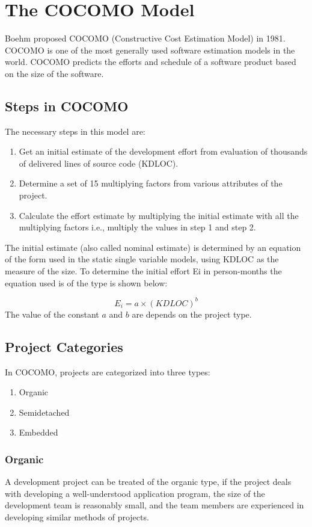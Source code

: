 \chapter{The COCOMO Model}
Boehm proposed COCOMO (Constructive Cost Estimation Model) in 1981. COCOMO is one of the most generally used software estimation models in the world. COCOMO predicts the efforts and schedule of a software product based on the size of the software.

\section{Steps in COCOMO}
The necessary steps in this model are:

\begin{enumerate}
 \item Get an initial estimate of the development effort from evaluation of thousands of delivered lines of source code (KDLOC).
 \item Determine a set of 15 multiplying factors from various attributes of the project.
 \item Calculate the effort estimate by multiplying the initial estimate with all the multiplying factors i.e., multiply the values in step 1 and step 2.
\end{enumerate}

The initial estimate (also called nominal estimate) is determined by an equation of the form used in the static single variable models, using KDLOC as the measure of the size. To determine the initial effort Ei in person-months the equation used is of the type is shown below:

$$E_i = a \times (KDLOC)^b$$
The value of the constant $a$ and $b$ are depends on the project type.

\section{Project Categories}
In COCOMO, projects are categorized into three types:

\begin{enumerate}
 \item Organic
 \item Semidetached
 \item Embedded
\end{enumerate}

\subsection{Organic}
A development project can be treated of the organic type, if the project deals with developing a well-understood application program, the size of the development team is reasonably small, and the team members are experienced in developing similar methods of projects.

